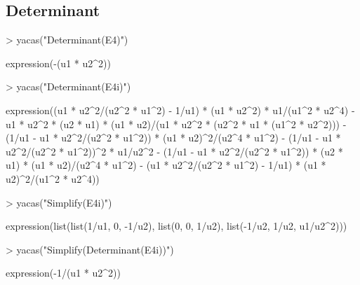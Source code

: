 \documentclass[]{article}
\begin{document}
\subsection{Determinant}

\begin{Schunk}
\begin{Sinput}
> yacas("Determinant(E4)")
\end{Sinput}
\begin{Soutput}
expression(-(u1 * u2^2))
\end{Soutput}
\begin{Sinput}
> yacas("Determinant(E4i)")
\end{Sinput}
\begin{Soutput}
expression((u1 * u2^2/(u2^2 * u1^2) - 1/u1) * (u1 * u2^2) * u1/(u1^2 * 
    u2^4) - u1 * u2^2 * (u2 * u1) * (u1 * u2)/(u1 * u2^2 * (u2^2 * 
    u1 * (u1^2 * u2^2))) - (1/u1 - u1 * u2^2/(u2^2 * u1^2)) * 
    (u1 * u2)^2/(u2^4 * u1^2) - (1/u1 - u1 * u2^2/(u2^2 * u1^2))^2 * 
    u1/u2^2 - (1/u1 - u1 * u2^2/(u2^2 * u1^2)) * (u2 * u1) * 
    (u1 * u2)/(u2^4 * u1^2) - (u1 * u2^2/(u2^2 * u1^2) - 1/u1) * 
    (u1 * u2)^2/(u1^2 * u2^4))
\end{Soutput}
\begin{Sinput}
> yacas("Simplify(E4i)")
\end{Sinput}
\begin{Soutput}
expression(list(list(1/u1, 0, -1/u2), list(0, 0, 1/u2), list(-1/u2, 
    1/u2, u1/u2^2)))
\end{Soutput}
\begin{Sinput}
> yacas("Simplify(Determinant(E4i))")
\end{Sinput}
\begin{Soutput}
expression(-1/(u1 * u2^2))
\end{Soutput}
\end{Schunk}
\end{document}
